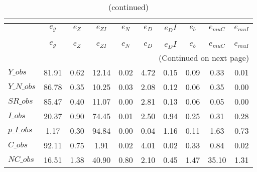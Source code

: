  
\begin{center}
\begin{longtable}{lccccccccc} 
\caption{VARIANCE DECOMPOSITION (in percent)}\\
 \label{Table:th_var_decomp_uncond}\\
\toprule 
$               $	 & 	 $        {e_g}$	 & 	 $        {e_Z}$	 & 	 $     {e_{ZI}}$	 & 	 $        {e_N}$	 & 	 $        {e_D}$	 & 	 $       {e_DI}$	 & 	 $        {e_b}$	 & 	 $    {e_{muC}}$	 & 	 $    {e_{muI}}$\\
\midrule \endfirsthead 
\caption{(continued)}\\
 \toprule \\ 
$               $	 & 	 $        {e_g}$	 & 	 $        {e_Z}$	 & 	 $     {e_{ZI}}$	 & 	 $        {e_N}$	 & 	 $        {e_D}$	 & 	 $       {e_DI}$	 & 	 $        {e_b}$	 & 	 $    {e_{muC}}$	 & 	 $    {e_{muI}}$\\
\midrule \endhead 
\midrule \multicolumn{10}{r}{(Continued on next page)} \\ \bottomrule \endfoot 
\bottomrule \endlastfoot 
$Y\_obs         $	 & 	        81.91	 & 	         0.62	 & 	        12.14	 & 	         0.02	 & 	         4.72	 & 	         0.15	 & 	         0.09	 & 	         0.33	 & 	         0.01 \\ 
$Y\_N\_obs      $	 & 	        86.78	 & 	         0.35	 & 	        10.25	 & 	         0.03	 & 	         2.08	 & 	         0.12	 & 	         0.06	 & 	         0.35	 & 	         0.00 \\ 
$SR\_obs        $	 & 	        85.47	 & 	         0.40	 & 	        11.07	 & 	         0.00	 & 	         2.81	 & 	         0.13	 & 	         0.06	 & 	         0.05	 & 	         0.00 \\ 
$I\_obs         $	 & 	        20.37	 & 	         0.90	 & 	        74.45	 & 	         0.01	 & 	         2.50	 & 	         0.94	 & 	         0.25	 & 	         0.31	 & 	         0.28 \\ 
$p\_I\_obs      $	 & 	         1.17	 & 	         0.30	 & 	        94.84	 & 	         0.00	 & 	         0.04	 & 	         1.16	 & 	         0.11	 & 	         1.63	 & 	         0.73 \\ 
$C\_obs         $	 & 	        92.11	 & 	         0.75	 & 	         1.91	 & 	         0.02	 & 	         4.01	 & 	         0.02	 & 	         0.33	 & 	         0.84	 & 	         0.02 \\ 
$NC\_obs        $	 & 	        16.51	 & 	         1.38	 & 	        40.90	 & 	         0.80	 & 	         2.10	 & 	         0.45	 & 	         1.47	 & 	        35.10	 & 	         1.31 \\ 

\end{longtable}
\end{center}
